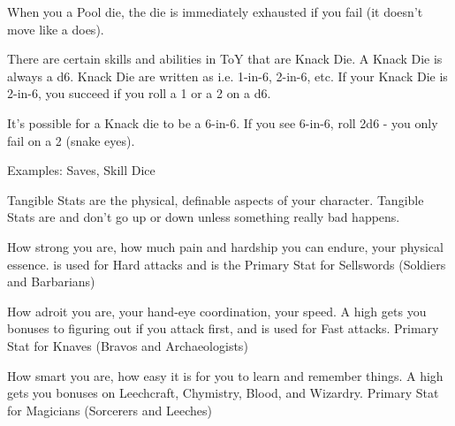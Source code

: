 {



When you \RS a Pool die, the die is immediately exhausted if you fail (it doesn't move \DCDOWN like a \UD does).  




There are certain skills and abilities in ToY that are Knack Die.  A Knack Die is always a d6.  Knack Die are written as  i.e. 1-in-6, 2-in-6, etc.  If your Knack Die is 2-in-6, you succeed if you roll a 1 or a 2 on a d6.  

It's possible for a Knack die to be a 6-in-6.  If you see 6-in-6, roll 2d6 - you only fail on a 2 (snake eyes).

Examples: Saves, Skill Dice

\newpage


Tangible Stats are the physical, definable aspects of your character.  Tangible Stats are \STATIC and don't go up or down unless something really bad happens.


How strong you are, how much pain and hardship you can endure, your physical essence.  \VIG is used for Hard attacks and is the Primary Stat for Sellswords (Soldiers and Barbarians)



How adroit you are, your hand-eye coordination, your speed.  A high \DEX gets you bonuses to figuring out if you attack first, and is used for Fast attacks.  Primary Stat for Knaves (Bravos and Archaeologists)



How smart you are, how easy it is for you to learn and remember things.   A high \INT gets you bonuses on Leechcraft, Chymistry, Blood, and Wizardry. Primary Stat for Magicians (Sorcerers and Leeches)


}
